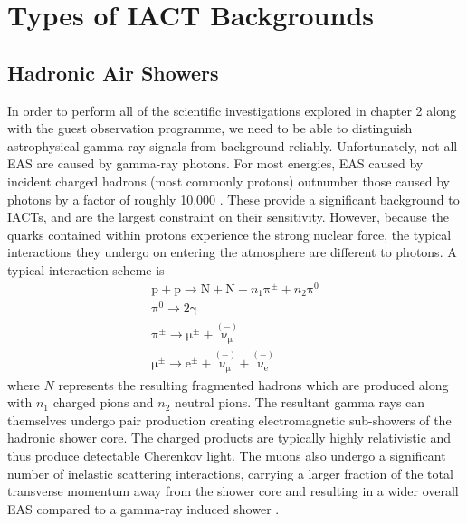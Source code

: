 \section{Types of IACT Backgrounds}
\subsection{Hadronic Air Showers}

In order to perform all of the scientific investigations explored in chapter 2 along with the guest observation programme, we need to be able to distinguish astrophysical gamma-ray signals from background reliably. Unfortunately, not all EAS are caused by gamma-ray photons. For most energies, EAS caused by incident charged hadrons (most commonly protons) outnumber those caused by photons by a factor of roughly 10,000 \cite{Benbow}. These provide a significant background to IACTs, and are the largest constraint on their sensitivity. However, because the quarks contained within protons experience the strong nuclear force, the typical interactions they undergo on entering the atmosphere are different to photons. A typical interaction scheme \cite{EAS} is
\begin{gather*}
\mathrm{p}+\mathrm{p}\rightarrow \mathrm{N}+\mathrm{N}+n_1 \mathrm{\pi^{\pm}}+n_2\mathrm{\pi^0} \\
\mathrm{\pi^0} \rightarrow \mathrm{2\gamma} \\
\mathrm{\mathrm{\pi^{\pm}}} \rightarrow \mathrm{\mu^{\pm}}+\mathrm{\overset{(-)}{\nu_{\mu}}}\\
\mathrm{\mu^{\pm}} \rightarrow \mathrm{e^{\pm}}+\mathrm{\overset{(-)}{\nu_{\mu}}}+\mathrm{\overset{(-)}{\nu_{e}}}
\end{gather*}
where $N$ represents the resulting fragmented hadrons which are produced along with $n_1$ charged pions and $n_2$ neutral pions. The resultant gamma rays can themselves undergo pair production creating electromagnetic sub-showers of the hadronic shower core. The charged products are typically highly relativistic and thus produce detectable Cherenkov light. The muons also undergo a significant number of inelastic scattering interactions, carrying a larger fraction of the total transverse momentum away from the shower core and resulting in a wider overall EAS compared to a gamma-ray induced shower \cite{tomthesis}.  


